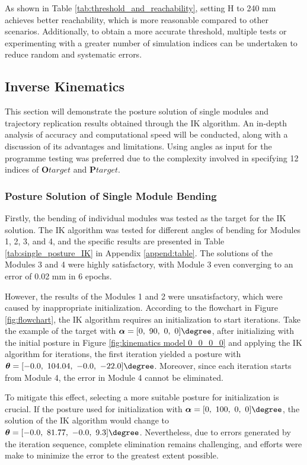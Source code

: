 \vspace{-5mm}

As shown in Table \ref{tab:threshold_and_reachability}, setting H to 240 mm achieves better reachability, 
which is more reasonable compared to other scenarios. Additionally, to obtain a more accurate threshold, 
multiple tests or experimenting with a greater number of simulation indices can be undertaken to reduce random 
and systematic errors.
\subsection{Inverse Kinematics}
This section will demonstrate the posture solution of single modules and trajectory replication results 
obtained through the IK algorithm. An in-depth analysis of accuracy and computational speed will be conducted, 
along with a discussion of its advantages and limitations. Using angles as input for the programme testing was 
preferred due to the complexity involved in specifying 12 indices of $\textbf{O}{target}$ and $\textbf{P}{target}$. 
\subsubsection{Posture Solution of Single Module Bending}
Firstly, the bending of individual modules was tested as the target for the IK solution. The 
IK algorithm was tested for different angles of bending for Modules 1, 2, 3, and 4, and the 
specific results are presented in Table \ref{tab:single_posture_IK} in Appendix \ref{append:table}. The 
solutions of the Modules 3 and 4 were highly satisfactory, with Module 3 even converging to an error of 0.02 mm 
in 6 epochs. 

However, the results of the Modules 1 and 2 were unsatisfactory, which were caused by inappropriate 
initialization. According to the flowchart in Figure \ref{fig:flowchart}, the IK algorithm requires an 
initialization to start iterations. Take the example of the target with 
$\boldsymbol{\alpha} = [0,\ 90,\ 0,\ 0]\degree$, after initializing with the initial posture in Figure 
\ref{fig:kinematics model 0_0_0_0} and applying the IK algorithm for iterations, the first iteration yielded 
a posture with 
$\boldsymbol{\theta} = [-0.0,\ 104.04,\ -0.0,\ -22.0]\degree$. Moreover, since each iteration starts from Module 4, 
the error in Module 4 cannot be eliminated. 

To mitigate this effect, selecting a more suitable posture for 
initialization is crucial. If the posture used for initialization with 
$\boldsymbol{\alpha} = [0,\ 100,\ 0,\ 0]\degree$, the solution of the IK algorithm would change to 
$\boldsymbol{\theta} = [-0.0,\ 81.77,\ -0.0,\ 9.3]\degree$. Nevertheless, due to errors generated by the 
iteration sequence, complete elimination remains challenging, and efforts were make to minimize the error to the 
greatest extent possible.  

